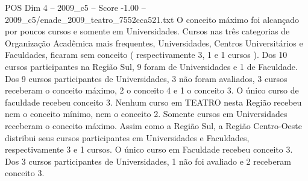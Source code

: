 \begin{textsample}{POS Dim 4 – 2009\_c5 – Score -1.00 – 2009\_c5/enade\_2009\_teatro\_7552cca521.txt}
O conceito máximo foi alcançado por poucos cursos e somente em Universidades.
Cursos nas três categorias de Organização Acadêmica mais frequentes, Universidades, Centros Universitários e Faculdades, ficaram sem conceito ( respectivamente 3, 1 e 1 cursos ).
Dos 10 cursos participantes na Região Sul, 9 foram de Universidades e 1 de Faculdade.
Dos 9 cursos participantes de Universidades, 3 não foram avaliados, 3 cursos receberam o conceito máximo, 2 o conceito 4 e 1 o conceito 3.
O único curso de faculdade recebeu conceito 3.
Nenhum curso em TEATRO nesta Região recebeu nem o conceito mínimo, nem o conceito 2.
Somente cursos em Universidades receberam o conceito máximo.
Assim como a Região Sul, a Região Centro-Oeste distribui seus cursos participantes em Universidades e Faculdades, respectivamente 3 e 1 cursos.
O único curso em Faculdade recebeu conceito 3.
Dos 3 cursos participantes de Universidades, 1 não foi avaliado e 2 receberam conceito 3.

\end{textsample}
